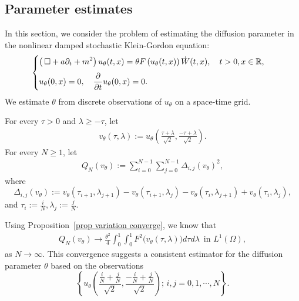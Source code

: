 \documentclass[11pt,reqno]{amsart}
\numberwithin{equation}{section}
\newcommand{\1}{{\bf 1}}
\newcommand{\2}{{\bf 2}}
\newcommand*\DAlambert{\mathop{} \mathbin\Box}%
\begin{document}
        
       

  \subsection{Parameter estimates}   
In this section, we consider the problem of estimating the diffusion parameter in the  nonlinear damped stochastic Klein-Gordon equation:
       \begin{equation}\label{eq:DSKG para}
\begin{cases}
\vspace{6pt}
\displaystyle{\left (\DAlambert+a\partial_t+m^2 \right)u_{\theta}(t,x)= \theta F\left(u_{\theta}(t,x)\right)\dot    W(t,x), \quad t>0, x \in \mathbb R,}\\
\displaystyle{u_{\theta}(0, x) =0, \quad \frac{\partial}{\partial t} u_{\theta}(0, x) = 0.}
\end{cases}
\end{equation}  
 We estimate $\theta$ from discrete observations of $u_\theta$ on a space-time grid.
 
    For every $\tau>0$ and $\lambda\ge -\tau$,    let
       \begin{align}\label{eq v theta}
   v_{\theta}(\tau, \lambda):=  u_{\theta}\left(\frac{\tau+\lambda}{\sqrt{2}}, \frac{-\tau+\lambda}{\sqrt{2}}\right). 
\end{align}
     For every $N\ge1$, let 
       \begin{align}\label{eq V v}
Q_{N}(v_{\theta}):=  \sum_{i=0}^{N-1}\sum_{j=0}^{N-1}\Delta_{i,j}(v_{\theta})^2,
\end{align}
where 
$$
\Delta_{i,j}(v_{\theta})  := v_{\theta}\left(\tau_{i+1}, \lambda_{j+1}  \right)-v_{\theta}\left(\tau_{i+1}, \lambda_{j}\right)-v_{\theta}\left(\tau_{i}, \lambda_{j+1}  \right) +v_{\theta}\left(\tau_{i}, \lambda_{j}\right), 
$$ 
 and    $\tau_i:=\frac{i}{N}, \lambda_j:=\frac{j}{N}$. 
  
  Using Proposition~\ref{prop variation converge},  we know that
  \begin{align}\label{eq variation converge theta}
  Q_{N}(v_{\theta})\longrightarrow \frac{\theta^2 }{4}    \int_0^1\int_0^1     F^2 \big(v_{\theta}(\tau, \lambda) \big) d\tau d\lambda\, \,\, \text{in } L^{1}(\Omega), 
  \end{align}
 as $N\rightarrow\infty$.  
This convergence suggests  a consistent  estimator for the diffusion parameter $\theta$ based on the observations
$$\left\{u_{\theta}\left(\frac{\frac{i}{N}+\frac{j}{N} }{\sqrt 2}, \frac{-\frac{i}{N}+\frac{j}{N} }{\sqrt 2} \right);\, i, j = 0,1, \cdots, N\right\}.$$
  
\end{document}
